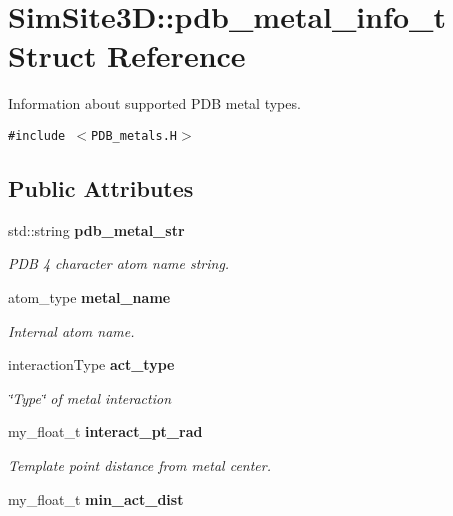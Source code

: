 \section{SimSite3D::pdb\_\-metal\_\-info\_\-t Struct Reference}
\label{structSimSite3D_1_1pdb__metal__info__t}
Information about supported PDB metal types.  


{\tt \#include $<$PDB\_\-metals.H$>$}

\subsection*{Public Attributes}
\begin{CompactItemize}
\item 
std::string \bf{pdb\_\-metal\_\-str}\label{structSimSite3D_1_1pdb__metal__info__t_8e625c4fafab8e1ff847552154be7499}

\begin{CompactList}\small\item\em PDB 4 character atom name string. \item\end{CompactList}\item 
atom\_\-type \bf{metal\_\-name}\label{structSimSite3D_1_1pdb__metal__info__t_f4efbc1c966cfe03d4f2344ecd36cf41}

\begin{CompactList}\small\item\em Internal atom name. \item\end{CompactList}\item 
interaction\-Type \bf{act\_\-type}\label{structSimSite3D_1_1pdb__metal__info__t_3a95b5df651db4595e660c0dbfffd1b4}

\begin{CompactList}\small\item\em \char`\"{}Type\char`\"{} of metal interaction \item\end{CompactList}\item 
my\_\-float\_\-t \bf{interact\_\-pt\_\-rad}\label{structSimSite3D_1_1pdb__metal__info__t_234095b78b3ddac53370f4f7416ebe1a}

\begin{CompactList}\small\item\em Template point distance from metal center. \item\end{CompactList}\item 
my\_\-float\_\-t \bf{min\_\-act\_\-dist}\label{structSimSite3D_1_1pdb__metal__info__t_eff78ccd9357744713418a32272b06ed}


\end{CompactItemize}
